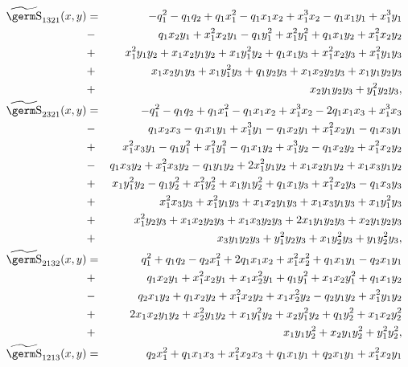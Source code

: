 {{\begin{eqnarray*}
\wt{\s}_{1321}(x,y) & = & - q_1^2 - q_1 q_2 + q_1 x_1^2 - 
  q_1 x_1 x_2 + x_1^3 x_2 - q_1 x_1 y_1 + x_1^3 y_1 \\ 
 &- &  q_1 x_2 y_1 + x_1^2 x_2 y_1 - 
  q_1 y_1^2 +x_1^2 y_1^2 + 
  q_1 x_1 y_2 + x_1^2 x_2 y_2 \\ 
 &+ &  x_1^2 y_1 y_2 + 
  x_1 x_2 y_1 y_2 + x_1 y_1^2 y_2 + q_1 x_1 y_3 + 
  x_1^2 x_2 y_3 + x_1^2 y_1 y_3\\ 
 &+ &  x_1 x_2 y_1 y_3 + x_1 y_1^2 y_3 + q_1 y_2 y_3 + 
  x_1 x_2 y_2 y_3 + x_1 y_1 y_2 y_3\\ 
 &+ & x_2 y_1 y_2 y_3 + y_1^2 y_2 y_3, \\ 
\wt{\s}_{2321}(x,y) & = & - q_1^2 - q_1 q_2 + q_1 x_1^2 - 
  q_1 x_1 x_2 + x_1^3 x_2 - 2 q_1 x_1 x_3 + x_1^3 x_3 \\ 
 &- & q_1 x_2 x_3 - q_1 x_1 y_1 + 
  x_1^3 y_1 - q_1 x_2 y_1 + 
  x_1^2 x_2 y_1 - q_1 x_3 y_1\\ 
 &+ &   x_1^2 x_3 y_1 - q_1 y_1^2 + x_1^2 y_1^2 - q_1 x_1 y_2 + 
  x_1^3 y_2 - q_1 x_2 y_2 +x_1^2 x_2 y_2\\  
 &- & q_1 x_3 y_2 + 
  x_1^2 x_3 y_2 - q_1 y_1 y_2 + 
  2 x_1^2 y_1 y_2 + 
  x_1 x_2 y_1 y_2 + x_1 x_3 y_1 y_2\\ 
 &+ & x_1 y_1^2 y_2 - q_1 y_2^2 + 
  x_1^2 y_2^2 + x_1 y_1 y_2^2 + q_1 x_1 y_3 + x_1^2 x_2 y_3 - 
  q_1 x_3 y_3\\ 
 &+ & x_1^2 x_3 y_3 + 
  x_1^2 y_1 y_3 + x_1 x_2 y_1 y_3 + 
  x_1 x_3 y_1 y_3 + 
  x_1 y_1^2 y_3\\ 
 &+ & x_1^2 y_2 y_3 + 
  x_1 x_2 y_2 y_3 + x_1 x_3 y_2 y_3 + 
  2 x_1 y_1 y_2 y_3 + 
  x_2 y_1 y_2 y_3\\ 
 &+ & x_3 y_1 y_2 y_3 + 
  y_1^2 y_2 y_3 + x_1 y_2^2 y_3 + 
  y_1 y_2^2 y_3, \\ 
\wt{\s}_{2132}(x,y) & = & q_1^2 + q_1 q_2 - q_2 x_1^2 + 
  2 q_1 x_1 x_2 + x_1^2 x_2^2 + q_1 x_1 y_1 - q_2 x_1 y_1\\ 
 &+ & q_1 x_2 y_1 + x_1^2 x_2 y_1 + 
  x_1 x_2^2 y_1 + q_1 y_1^2 + x_1 x_2 y_1^2 + q_1 x_1 y_2 \\ 
 &- & q_2 x_1 y_2 + q_1 x_2 y_2 + 
  x_1^2 x_2 y_2 + x_1 x_2^2 y_2 - 
  q_2 y_1 y_2 + x_1^2 y_1 y_2\\ 
 &+ & 2 x_1 x_2 y_1 y_2 + 
  x_2^2 y_1 y_2 + x_1 y_1^2 y_2 + 
  x_2 y_1^2 y_2 + q_1 y_2^2 +x_1 x_2 y_2^2 \\ 
 &+ & x_1 y_1 y_2^2 + x_2 y_1 y_2^2 + y_1^2 y_2^2, \\ 
\wt{\s}_{1213}(x,y) & = & q_2 x_1^2 + q_1 x_1 x_3 + 
  x_1^2 x_2 x_3 + q_1 x_1 y_1 + 
  q_2 x_1 y_1 + x_1^2 x_2 y_1\\ 

\end{eqnarray*}}}
